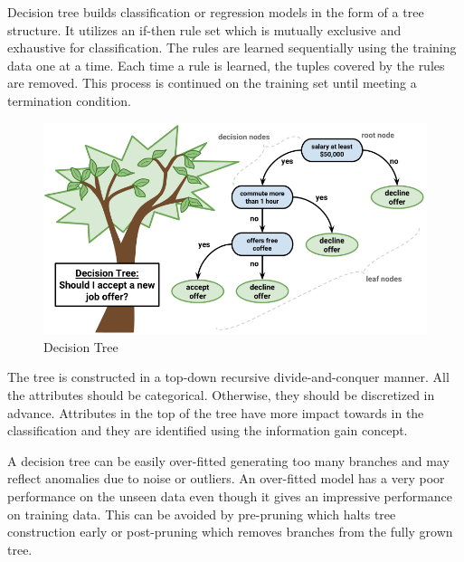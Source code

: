 \begin{itemize}
\begin{itemize}
                Decision tree builds classification or regression models in the form of a tree structure. It utilizes an if-then rule set which is mutually exclusive and exhaustive for classification. The rules are learned sequentially using the training data one at a time. Each time a rule is learned, the tuples covered by the rules are removed. This process is continued on the training set until meeting a termination condition.
            
            \begin{figure}[htbp]
                \centering
	            \includegraphics[scale=0.3]{Figures/decision_tree.png}
                \caption[Decision Tree]{Decision Tree}
	            \label{fig:Decision Tree}
                \end{figure}

                The tree is constructed in a top-down recursive divide-and-conquer manner. All the attributes should be categorical. Otherwise, they should be discretized in advance. Attributes in the top of the tree have more impact towards in the classification and they are identified using the information gain concept.

                A decision tree can be easily over-fitted generating too many branches and may reflect anomalies due to noise or outliers. An over-fitted model has a very poor performance on the unseen data even though it gives an impressive performance on training data. This can be avoided by pre-pruning which halts tree construction early or post-pruning which removes branches from the fully grown tree.


\end{itemize}
\end{itemize}
